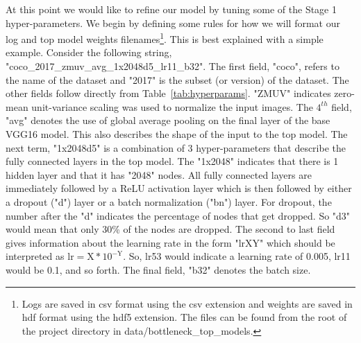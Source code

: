 \documentclass[12pt,journal,compsoc]{IEEEtran}
\begin{document}

At this point we would like to refine our model by tuning some of the Stage 1 hyper-parameters.  We begin by defining some rules for how we will format our log and top model weights filenames\footnote{Logs are saved in csv format using the csv extension and weights are saved in hdf format using the hdf5 extension. The files can be found from the root of the project directory in data/bottleneck\_top\_models.}. This is best explained with a simple example. Consider the following string, "coco\_2017\_zmuv\_avg\_1x2048d5\_lr11\_b32". The first field, "coco", refers to the name of the dataset and "2017" is the subset (or version) of the dataset. The other fields follow directly from Table~\ref{tab:hyperparams}. "ZMUV" indicates zero-mean unit-variance scaling was used to normalize the input images. The $4^{th}$ field, "avg" denotes the use of global average pooling on the final layer of the base VGG16 model. This also describes the shape of the input to the top model. The next term, "1x2048d5" is a combination of 3 hyper-parameters that describe the fully connected layers in the top model. The "1x2048" indicates that there is 1 hidden layer and that it has "2048" nodes.  All fully connected layers are immediately followed by a ReLU activation layer which is then followed by either a dropout ("d") layer or a batch normalization ("bn") layer. For dropout, the number after the "d" indicates the percentage of nodes that get dropped. So "d3" would mean that only 30\% of the nodes are dropped. The second to last field gives information about the learning rate in the form "lrXY" which should be interpreted as $\mathrm{lr = X * 10^{-Y}}$.  So, lr53 would indicate a learning rate of 0.005, lr11 would be 0.1, and so forth. The final field, "b32" denotes the batch size.
\end{document}
